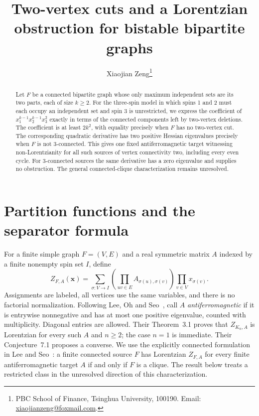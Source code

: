\documentclass[11pt]{article}
\title{Two-vertex cuts and a Lorentzian obstruction\newline
for bistable bipartite graphs}
\author{Xiaojian Zeng\thanks{PBC School of Finance, Tsinghua University,
100190. Email: \href{mailto:xiaojianzeng@foxmail.com}{xiaojianzeng@foxmail.com}.}}
\date{}
\begin{document}
\maketitle
\begin{abstract}
Let $F$ be a connected bipartite graph whose only maximum independent sets
are its two parts, each of size $k\ge2$. For the three-spin model in which
spins 1 and 2 must each occupy an independent set and spin 3 is unrestricted,
we express the coefficient of $x_1^{k-1}x_2^{k-1}x_3^2$ exactly in terms of
the connected components left by two-vertex deletions. The coefficient is
at least $2k^2$, with equality precisely when $F$ has no two-vertex cut.
The corresponding quadratic derivative has two positive Hessian eigenvalues
precisely when $F$ is not 3-connected. This gives one fixed antiferromagnetic
target witnessing non-Lorentzianity for all such sources of vertex
connectivity two, including every even cycle. For 3-connected sources the
same derivative has a zero eigenvalue and supplies no obstruction.
The general connected-clique characterization remains unresolved.
\end{abstract}

\section{Partition functions and the separator formula}

For a finite simple graph $F=(V,E)$ and a real symmetric matrix $A$ indexed
by a finite nonempty spin set $I$, define
\begin{equation}\label{eq:partition}
 Z_{F,A}(\mathbf{x})=
 \sum_{\sigma:V\to I}
 \left(\prod_{uv\in E}A_{\sigma(u),\sigma(v)}\right)
 \prod_{v\in V}x_{\sigma(v)}.
\end{equation}
Assignments are labeled, all vertices use the same variables, and there is
no factorial normalization. Following Lee, Oh and Seo~\cite{LOS}, call $A$
\emph{antiferromagnetic} if it is entrywise nonnegative and has at most one
positive eigenvalue, counted with multiplicity. Diagonal entries are allowed.
Their Theorem~3.1 proves that $Z_{K_n,A}$ is Lorentzian for every such $A$
and $n\ge2$; the case $n=1$ is immediate.
Their Conjecture~7.1 proposes a converse. We use the explicitly connected
formulation in Lee and Seo~\cite[Section~6]{LS}: a finite connected source
$F$ has Lorentzian $Z_{F,A}$ for every finite antiferromagnetic target $A$
if and only if $F$ is a clique. The result below treats a restricted class
in the unresolved direction of this characterization.
\end{document}
